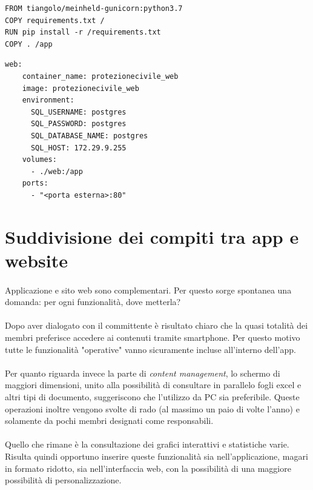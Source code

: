 \documentclass[11pt,a4paper,english]{article}
\begin{document}
\begin{lstlisting}[caption=Dockerfile]
FROM tiangolo/meinheld-gunicorn:python3.7
COPY requirements.txt /
RUN pip install -r /requirements.txt
COPY . /app
\end{lstlisting}

\begin{lstlisting}[caption=File di configurazione per Docker compose]
web:
    container_name: protezionecivile_web
    image: protezionecivile_web
    environment:
      SQL_USERNAME: postgres
      SQL_PASSWORD: postgres
      SQL_DATABASE_NAME: postgres
      SQL_HOST: 172.29.9.255
    volumes:
      - ./web:/app
    ports:
      - "<porta esterna>:80"
\end{lstlisting}



\section{Suddivisione dei compiti tra app e website}

\paragraph{} Applicazione e sito web sono complementari. Per questo sorge spontanea una domanda: per ogni funzionalità, dove metterla? 

\paragraph{} Dopo aver dialogato con il committente è risultato chiaro che la quasi totalità dei membri preferisce accedere ai contenuti tramite smartphone. Per questo motivo tutte le funzionalità "operative" vanno sicuramente incluse all'interno dell'app. 

\paragraph{} Per quanto riguarda invece la parte di \emph{content management}, lo schermo di maggiori dimensioni, unito alla possibilità di consultare in parallelo fogli excel e altri tipi di documento, suggeriscono che l'utilizzo da PC sia preferibile. Queste operazioni inoltre vengono svolte di rado (al massimo un paio di volte l'anno) e solamente da pochi membri designati come responsabili. 

\paragraph{} Quello che rimane è la consultazione dei grafici interattivi e statistiche varie. Risulta quindi opportuno inserire queste funzionalità sia nell'applicazione, magari in formato ridotto, sia nell'interfaccia web, con la possibilità di una maggiore possibilità di personalizzazione.
\end{document}
